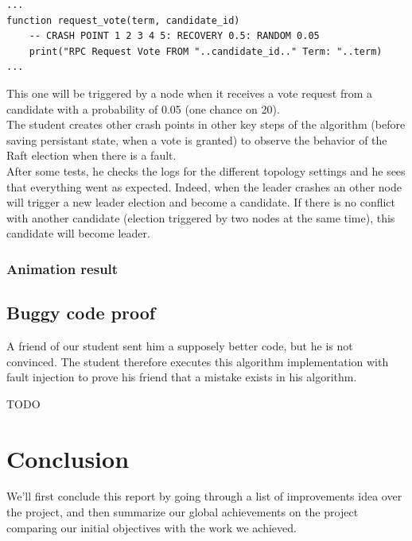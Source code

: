 \documentclass{eplmastersthesis}
\begin{document}
          \begin{lstlisting}[style=MyLua]
...
function request_vote(term, candidate_id)
    -- CRASH POINT 1 2 3 4 5: RECOVERY 0.5: RANDOM 0.05
    print("RPC Request Vote FROM "..candidate_id.." Term: "..term)
...
          \end{lstlisting}

          This one will be triggered by a node when it receives a vote request
          from a candidate with a probability of 0.05 (one chance on 20).\\
          The student creates other crash points in other key steps of
          the algorithm (before saving persistant state, when a vote is granted)
          to observe the behavior of the Raft election when there is a fault.\\

          After some tests, he checks the logs for the different topology
          settings and he sees that everything went as expected. Indeed, when
          the leader crashes an other node will trigger a new leader
          election and become a candidate. If there is no conflict with another
          candidate (election triggered by two nodes at the same time), this
          candidate will become leader.\\

        \subsection{Animation result}



      \section{Buggy code proof}

        A friend of our student sent him a supposely better code, but he is not
        convinced. The student therefore executes this algorithm implementation
        with fault injection to prove his friend that a mistake exists in his
        algorithm.

        {\color{red} TODO}

  \chapter{Conclusion}

    We'll first conclude this report by going through a list of improvements
    idea over the project, and then summarize our global achievements on the
    project comparing our initial objectives with the work we achieved.
\end{document}
